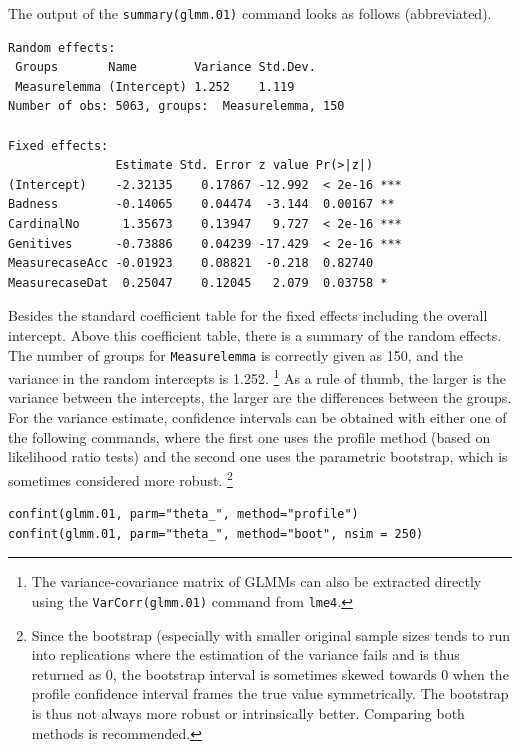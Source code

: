 The output of the \texttt{summary(glmm.01)} command looks as follows (abbreviated).

\vspace{0.5\baselineskip}

\begin{lstlisting}
Random effects:
 Groups       Name        Variance Std.Dev.
 Measurelemma (Intercept) 1.252    1.119   
Number of obs: 5063, groups:  Measurelemma, 150

Fixed effects:
               Estimate Std. Error z value Pr(>|z|)    
(Intercept)    -2.32135    0.17867 -12.992  < 2e-16 ***
Badness        -0.14065    0.04474  -3.144  0.00167 ** 
CardinalNo      1.35673    0.13947   9.727  < 2e-16 ***
Genitives      -0.73886    0.04239 -17.429  < 2e-16 ***
MeasurecaseAcc -0.01923    0.08821  -0.218  0.82740    
MeasurecaseDat  0.25047    0.12045   2.079  0.03758 *  
\end{lstlisting}

Besides the standard coefficient table for the fixed effects including the overall intercept.
Above this coefficient table, there is a summary of the random effects.
The number of groups for \texttt{Measurelemma} is correctly given as 150, and the variance in the random intercepts is 1.252.%
\footnote{The variance-covariance matrix of GLMMs can also be extracted directly using the \texttt{VarCorr(glmm.01)} command from \texttt{lme4}.}
As a rule of thumb, the larger is the variance between the intercepts, the larger are the differences between the groups.
For the variance estimate, confidence intervals can be obtained with either one of the following commands, where the first one uses the profile method (based on likelihood ratio tests) and the second one uses the parametric bootstrap, which is sometimes considered more robust.%
\footnote{Since the bootstrap (especially with smaller original sample sizes tends to run into replications where the estimation of the variance fails and is thus returned as 0, the bootstrap interval is sometimes skewed towards 0 when the profile confidence interval frames the true value symmetrically. The bootstrap is thus not always more robust or intrinsically better.
Comparing both methods is recommended.}

\vspace{0.5\baselineskip}

\begin{lstlisting}
confint(glmm.01, parm="theta_", method="profile")
confint(glmm.01, parm="theta_", method="boot", nsim = 250)
\end{lstlisting}

